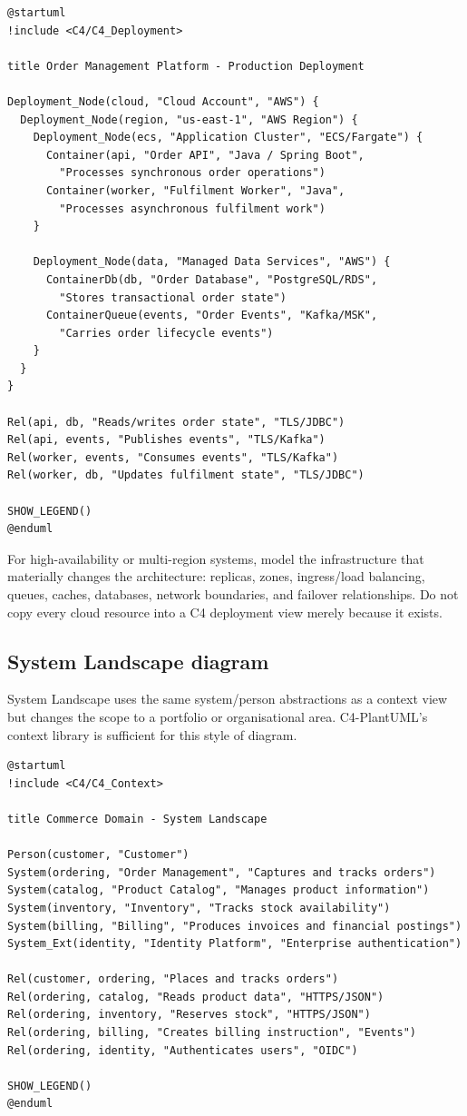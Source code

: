 \documentclass[11pt]{article}
\begin{document}
\begin{lstlisting}[language=PlantUML]
@startuml
!include <C4/C4_Deployment>

title Order Management Platform - Production Deployment

Deployment_Node(cloud, "Cloud Account", "AWS") {
  Deployment_Node(region, "us-east-1", "AWS Region") {
    Deployment_Node(ecs, "Application Cluster", "ECS/Fargate") {
      Container(api, "Order API", "Java / Spring Boot",
        "Processes synchronous order operations")
      Container(worker, "Fulfilment Worker", "Java",
        "Processes asynchronous fulfilment work")
    }

    Deployment_Node(data, "Managed Data Services", "AWS") {
      ContainerDb(db, "Order Database", "PostgreSQL/RDS",
        "Stores transactional order state")
      ContainerQueue(events, "Order Events", "Kafka/MSK",
        "Carries order lifecycle events")
    }
  }
}

Rel(api, db, "Reads/writes order state", "TLS/JDBC")
Rel(api, events, "Publishes events", "TLS/Kafka")
Rel(worker, events, "Consumes events", "TLS/Kafka")
Rel(worker, db, "Updates fulfilment state", "TLS/JDBC")

SHOW_LEGEND()
@enduml
\end{lstlisting}

For high-availability or multi-region systems, model the infrastructure that materially changes the architecture: replicas, zones, ingress/load balancing, queues, caches, databases, network boundaries, and failover relationships. Do not copy every cloud resource into a C4 deployment view merely because it exists.

\subsection{System Landscape diagram}

System Landscape uses the same system/person abstractions as a context view but changes the scope to a portfolio or organisational area. C4-PlantUML's context library is sufficient for this style of diagram.

\begin{lstlisting}[language=PlantUML]
@startuml
!include <C4/C4_Context>

title Commerce Domain - System Landscape

Person(customer, "Customer")
System(ordering, "Order Management", "Captures and tracks orders")
System(catalog, "Product Catalog", "Manages product information")
System(inventory, "Inventory", "Tracks stock availability")
System(billing, "Billing", "Produces invoices and financial postings")
System_Ext(identity, "Identity Platform", "Enterprise authentication")

Rel(customer, ordering, "Places and tracks orders")
Rel(ordering, catalog, "Reads product data", "HTTPS/JSON")
Rel(ordering, inventory, "Reserves stock", "HTTPS/JSON")
Rel(ordering, billing, "Creates billing instruction", "Events")
Rel(ordering, identity, "Authenticates users", "OIDC")

SHOW_LEGEND()
@enduml
\end{lstlisting}
\end{document}
